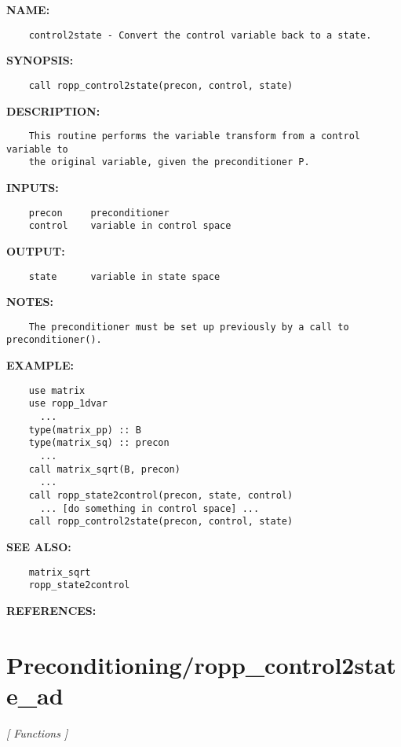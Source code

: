 \label{ch:robo40}
\label{ch:Preconditioning_ropp_control2state}
\textbf{NAME:}\hspace{0.08in}\begin{Verbatim}
    control2state - Convert the control variable back to a state.
\end{Verbatim}
\textbf{SYNOPSIS:}\hspace{0.08in}\begin{Verbatim}
    call ropp_control2state(precon, control, state)
\end{Verbatim}
\textbf{DESCRIPTION:}\hspace{0.08in}\begin{Verbatim}
    This routine performs the variable transform from a control variable to
    the original variable, given the preconditioner P.
\end{Verbatim}
\textbf{INPUTS:}\hspace{0.08in}\begin{Verbatim}
    precon     preconditioner
    control    variable in control space
\end{Verbatim}
\textbf{OUTPUT:}\hspace{0.08in}\begin{Verbatim}
    state      variable in state space
\end{Verbatim}
\textbf{NOTES:}\hspace{0.08in}\begin{Verbatim}
    The preconditioner must be set up previously by a call to preconditioner().
\end{Verbatim}
\textbf{EXAMPLE:}\hspace{0.08in}\begin{Verbatim}
    use matrix
    use ropp_1dvar
      ...
    type(matrix_pp) :: B
    type(matrix_sq) :: precon
      ...
    call matrix_sqrt(B, precon)
      ...
    call ropp_state2control(precon, state, control)
      ... [do something in control space] ...
    call ropp_control2state(precon, control, state)
\end{Verbatim}
\textbf{SEE ALSO:}\hspace{0.08in}\begin{Verbatim}
    matrix_sqrt
    ropp_state2control
\end{Verbatim}
\textbf{REFERENCES:}\hspace{0.08in}\section{Preconditioning/ropp\_control2state\_ad}
\textsl{[ Functions ]}

